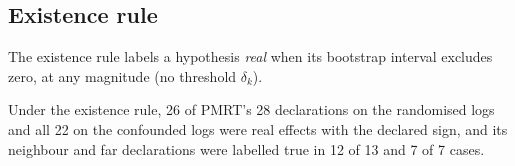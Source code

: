 \subsection{Existence rule}
\label{spec:gt.exist}

The existence rule labels a hypothesis \emph{real} when its bootstrap interval excludes zero, at any magnitude (no threshold $\delta_k$).

Under the existence rule, 26 of PMRT's 28 declarations on the randomised logs and all 22 on the confounded logs were real effects with the declared sign, and its neighbour and far declarations were labelled true in 12 of 13 and 7 of 7 cases.
